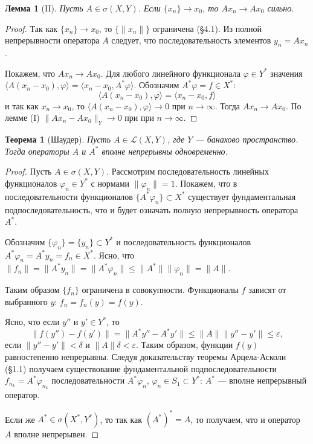 \documentclass[12pt,a4paper,titlepage,oneside]{book}
\theoremstyle{definition}
\theoremstyle{plain}
\newtheorem*{theorem}{Теорема}
\theoremstyle{break}
\theoremstyle{remark}
\theoremstyle{remark}
\theoremstyle{remark}
\theoremstyle{remark}
\theoremstyle{plain}
\newtheorem*{lemma}{Лемма}
\theoremstyle{plain}
\begin{document}
\begin{lemma}[II]
Пусть $A \in \sigma(X,Y)$. Если $\{x_n\}\to x_0$, то $Ax_n\to Ax_0$ сильно.
\end{lemma}

\begin{proof}
Так как $\{x_n\}\to x_0$, то $\{\lVert x_n\rVert\}$ ограничена (\S 4.1). Из полной непрерывности оператора $A$ следует, что последовательность элементов $y_n = Ax_n$ .

Покажем, что $Ax_n\to Ax_0$.
Для любого линейного функционала $\varphi\in Y^*$ значения $ \langle A(x_n-x_0), \varphi \rangle  =  \langle x_n-x_0, A^*\varphi \rangle $. Обозначим $A^*\varphi = f\in X^*$:
\begin{equation*}
\langle A(x_n-x_0), \varphi \rangle  =  \langle x_n-x_0, f \rangle 
\end{equation*}
и так как $x_n\to x_0$, то $ \langle A(x_n-x_0), \varphi \rangle \to 0$ при $n\to\infty$. Тогда $Ax_n\to Ax_0$. По лемме (I) $\lVert Ax_n-Ax_0\rVert_Y\to 0$ при при $n\to\infty$.
\end{proof}

\begin{theorem}[Шаудер]
Пусть $A \in \mathcal{L}(X, Y)$, где $Y$ --- банахово пространство. Тогда операторы $A$ и $A^*$ вполне непрерывны одновременно.
\end{theorem}

\begin{proof}
Пусть $A \in \sigma(X, Y)$. Рассмотрим последовательность линейных функционалов $\varphi_n \in Y^*$ с нормами $\lVert  \varphi_n \rVert = 1$. Покажем, что в последовательности функционалов $\{ A^* \varphi_n \} \subset X^*$ существует фундаментальная подпоследовательность, что и будет означать полную непрерывность оператора $A^*$.

Обозначим $\{\varphi_n\} = \{y_n\}\subset Y^*$ и последовательность функционалов $A^*\varphi_n = A^*y_n = f_n\in X^*$. Ясно, что $\lVert f_n\rVert = \lVert A^*y_n\rVert = \lVert A^*\varphi_n\rVert \leqslant \lVert A^*\rVert\lVert \varphi_n\rVert = \lVert A\rVert$.

Таким образом $\{f_n\}$ ограничена в совокупности. Функционалы $f$ зависят от выбранного $y$: $f_n = f_n(y) = f(y)$.

Ясно, что если $y''$ и $y'\in Y^*$, то
\begin{equation*}
\lVert f(y'')-f(y')\rVert = \lVert A^*y''-A^*y'\rVert\le\lVert A\rVert\lVert y''-y'\rVert\le\varepsilon,
\end{equation*}
если $\lVert y''-y'\rVert < \delta$ и $\lVert A\rVert\delta < \varepsilon$.
Таким образом, функции $f(y)$ равностепенно непрерывны. Следуя доказательству теоремы Арцела-Асколи (\S 1.1) получаем существование фундаментальной подпоследовательности $f_{n_k} = A^* \varphi_{n_k}$ последовательности $A^*\varphi_n$, $\varphi_n\in S_1\subset Y^*$: $A^*$ --- вполне непрерывный оператор.

Если же $A^*\in\sigma(X^*,Y^*)$, то так как $(A^*)^* = A$, то получаем, что и оператор $A$ вполне непрерывен.
\end{proof}
\end{document}
